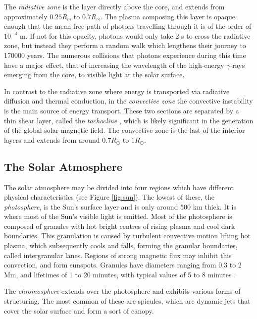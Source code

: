 The \emph{radiative zone} is the layer directly above the core, and extends from approximately $0.25 R_\odot$ to $0.7 R_\odot$.
The plasma composing this layer is opaque enough that the mean free path of photons travelling through it is of the order of $10^{-4}$ \si{m}.
If not for this opacity, photons would only take 2 \si{s} to cross the radiative zone, but instead they perform a random walk which lengthens their journey to \num{170000} years.
The numerous collisions that photons experience during this time have a major effect, that of increasing the wavelength of the high-energy $\gamma$-rays emerging from the core, to visible light at the solar surface.

In contrast to the radiative zone where energy is transported via radiative diffusion and thermal conduction, in the \emph{convective zone} the convective instability is the main source of energy transport.
These two sections are separated by a thin shear layer, called the \emph{tachocline} \citep{Spiegel1992}, which is likely significant in the generation of the global solar magnetic field.
The convective zone is the last of the interior layers and extends from around $0.7 R_\odot$ to $1 R_\odot$.

\subsection{The Solar Atmosphere}
\label{subsec:atmosphere}

The solar atmosphere may be divided into four regions which have different physical characteristics (see Figure \ref{fig:sun}).
The lowest of these, the \emph{photosphere}, is the Sun's surface layer and is only around 500 \si{km} thick.
It is where most of the Sun's visible light is emitted.
Most of the photosphere is composed of granules with hot bright centres of rising plasma and cool dark boundaries.
This granulation is caused by turbulent convective motion lifting hot plasma, which subsequently cools and falls, forming the granular boundaries, called intergranular lanes.
Regions of strong magnetic flux may inhibit this convection, and form sunspots.
Granules have diameters ranging from 0.3 to 2 \si{Mm}, and lifetimes of 1 to 20 minutes, with typical values of 5 to 8 minutes \citep{Priest2014}.

The \emph{chromosphere} extends over the photosphere and exhibits various forms of structuring.
The most common of these are spicules, which are dynamic jets that cover the solar surface and form a sort of canopy.

